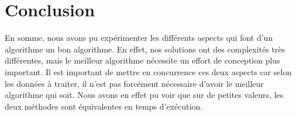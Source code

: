 \documentclass[a4paper, titlepage]{article}
\begin{document}
\section{Conclusion}

En somme, nous avons pu expérimenter les différents aspects qui font d'un algorithme un bon algorithme.
En effet, nos solutions ont des complexités très différentes, mais le meilleur algorithme nécessite un effort de conception plus important.
Il est important de mettre en concurrence ces deux aspects car selon les données à traiter, il n'est pas forcément nécessaire d'avoir le meilleur algorithme qui soit.
Nous avons en effet pu voir que sur de petites valeurs, les deux méthodes sont équivalentes en temps d'exécution.
\end{document}

